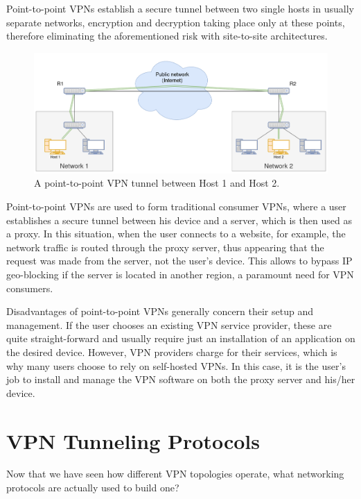 \documentclass[a4paper,12pt]{report}
\begin{document}
		Point-to-point VPNs establish a secure tunnel between two single hosts in usually separate networks, encryption and decryption taking place only at these points, therefore eliminating the aforementioned risk with site-to-site architectures.
		\begin{figure}[h]
			\includegraphics[width=\textwidth]{point-to-point_VPN}
			\centering
			\caption{A point-to-point VPN tunnel between Host 1 and Host 2.}
			\label{fig:point-to-point_VPN}
		\end{figure}
		
		Point-to-point VPNs are used to form traditional consumer VPNs, where a user establishes a secure tunnel between his device and a server, which is then used as a proxy. In this situation, when the user connects to a website, for example, the network traffic is routed through the proxy server, thus appearing that the request was made from the server, not the user's device. This allows to bypass IP geo-blocking if the server is located in another region, a paramount need for VPN consumers.
		
		Disadvantages of point-to-point VPNs generally concern their setup and management. If the user chooses an existing VPN service provider, these are quite straight-forward and usually require just an installation of an application on the desired device. However, VPN providers charge for their services, which is why many users choose to rely on self-hosted VPNs. In this case, it is the user's job to install and manage the VPN software on both the proxy server and his/her device.
		
		\section{VPN Tunneling Protocols}
		Now that we have seen how different VPN topologies operate, what networking protocols are actually used to build one?
\end{document}
